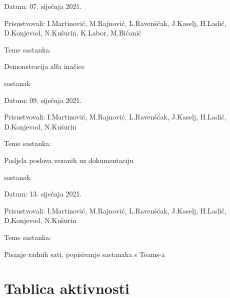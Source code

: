 \begin{packed_enum}
\begin{packed_item}
	\item Datum: 07. siječnja 2021.
	\item Prisustvovali: I.Martinović, M.Rajnović, L.Ravenšćak, J.Kaselj, H.Ladić, D.Konjevod, N.Kušurin, K.Labor, M.Bićanić
	\item Teme sastanka: 
	\begin{packed_item}
		\item   Demonstracija alfa inačice
	\end{packed_item}
\end{packed_item}
\item sastanak
\item[] \begin{packed_item}
	\item Datum: 09. siječnja 2021.
	\item Prisustvovali: I.Martinović, M.Rajnović, L.Ravenšćak, J.Kaselj, H.Ladić, D.Konjevod, N.Kušurin
	\item Teme sastanka: 
	\begin{packed_item}
		\item   Podjela poslova vezanih uz dokumentaciju
	\end{packed_item}
\end{packed_item}
\item sastanak
\item[] \begin{packed_item}
	\item Datum: 13. siječnja 2021.
	\item Prisustvovali: I.Martinović, M.Rajnović, L.Ravenšćak, J.Kaselj, H.Ladić, D.Konjevod, N.Kušurin
	\item Teme sastanka: 
	\begin{packed_item}
		\item   Pisanje radnih sati, popisivanje sastanaka s Teams-a
	\end{packed_item}
\end{packed_item}
	
	
	
		
			
		\end{packed_enum}
		
			
		\eject
		\section*{Tablica aktivnosti}
		
